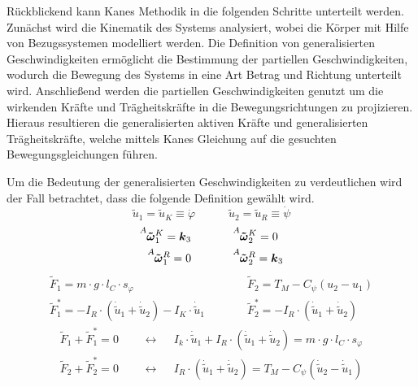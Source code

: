 Rückblickend kann Kanes Methodik in die folgenden Schritte unterteilt werden. Zunächst wird die Kinematik des Systems analysiert, wobei die Körper mit Hilfe von Bezugssystemen modelliert werden. Die Definition von generalisierten Geschwindigkeiten ermöglicht die Bestimmung der partiellen Geschwindigkeiten, wodurch die Bewegung des Systems in eine Art Betrag und Richtung unterteilt wird. Anschließend werden die partiellen Geschwindigkeiten genutzt um die wirkenden Kräfte und Trägheitskräfte in die Bewegungsrichtungen zu projizieren. Hieraus resultieren die generalisierten aktiven Kräfte und generalisierten Trägheitskräfte, welche mittels Kanes Gleichung auf die gesuchten Bewegungsgleichungen führen.

Um die Bedeutung der generalisierten Geschwindigkeiten zu verdeutlichen wird der Fall betrachtet, dass die folgende Definition gewählt wird.
\begin{equation}
\tilde{u}_1 = \tilde{u}_K \equiv \dot{\varphi} \hspace{35pt} \tilde{u}_2 = \tilde{u}_R \equiv \dot{\psi}
\end{equation}
\begin{equation}
\begin{split}
\vel{A}{\tilde{\omega}}{K}_1 = \bs{k}_3 &\hspace{35pt} \vel{A}{\tilde{\omega}}{K}_2 = 0
\\
\vel{A}{\tilde{\omega}}{R}_1 = 0 &\hspace{35pt} \vel{A}{\tilde{\omega}}{R}_2 = \bs{k}_3
\end{split}
\end{equation}
\begin{equation}
\begin{split}
\tilde{F}_1 = m\cdot g\cdot l_C\cdot s_{\varphi} &\hspace{35pt} \tilde{F}_2 = T_M - C_{\psi}(u_2-u_1) 
\\
\tilde{F}^*_1 = -I_R\cdot (\dot{\tilde{u}}_1 + \dot{\tilde{u}}_2) - I_K\cdot \dot{\tilde{u}}_1 &\hspace{35pt} \tilde{F}^*_2 = -I_R\cdot (\dot{\tilde{u}}_1 + \dot{\tilde{u}}_2)
\end{split}
\end{equation}
\begin{align}
\tilde{F}_1 + \tilde{F}^*_1 = 0 &\hspace{15pt}\leftrightarrow\hspace{15pt} I_k\cdot \dot{\tilde{u}}_1 + I_R\cdot (\dot{\tilde{u}}_1+\dot{\tilde{u}}_2) = m\cdot g\cdot l_C\cdot s_{\varphi} \label{tilde_bwg_1}
\\
\tilde{F}_2 + \tilde{F}^*_2 = 0 &\hspace{15pt}\leftrightarrow\hspace{15pt} I_R\cdot (\dot{\tilde{u}}_1+\dot{\tilde{u}}_2) = T_M - C_{\psi}(\dot{\tilde{u}}_2 - \dot{\tilde{u}}_1) \label{tilde_bwg_2}
\end{align}
